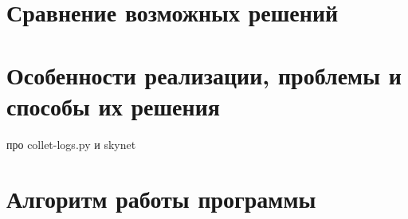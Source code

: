 \section{Сравнение возможных решений}
\section{Особенности реализации, проблемы и способы их решения}
про collet-logs.py и skynet
\section{Алгоритм работы программы}
